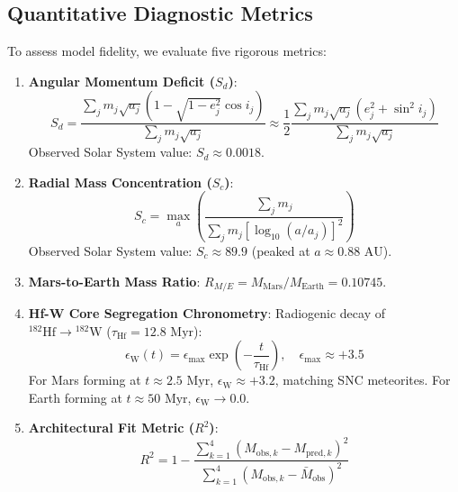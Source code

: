 \documentclass[11pt,a4paper]{article}
\begin{document}
\subsection{Quantitative Diagnostic Metrics}
To assess model fidelity, we evaluate five rigorous metrics:
\begin{enumerate}
    \item \textbf{Angular Momentum Deficit ($S_d$)}:
    \begin{equation}
    S_d = \frac{\sum_j m_j \sqrt{a_j} \left(1 - \sqrt{1 - e_j^2} \cos i_j\right)}{\sum_j m_j \sqrt{a_j}} \approx \frac{1}{2} \frac{\sum_j m_j \sqrt{a_j} (e_j^2 + \sin^2 i_j)}{\sum_j m_j \sqrt{a_j}}
    \end{equation}
    Observed Solar System value: $S_d \approx 0.0018$.
    
    \item \textbf{Radial Mass Concentration ($S_c$)}:
    \begin{equation}
    S_c = \max_a \left( \frac{\sum_j m_j}{\sum_j m_j \left[\log_{10}(a / a_j)\right]^2} \right)
    \end{equation}
    Observed Solar System value: $S_c \approx 89.9$ (peaked at $a \approx 0.88\text{ AU}$).
    
    \item \textbf{Mars-to-Earth Mass Ratio}: $R_{M/E} = M_{\text{Mars}} / M_{\text{Earth}} = 0.10745$.
    
    \item \textbf{Hf-W Core Segregation Chronometry}: Radiogenic decay of $^{182}\text{Hf} \to {}^{182}\text{W}$ ($\tau_{\text{Hf}} = 12.8\text{ Myr}$):
    \begin{equation}
    \epsilon_{\text{W}}(t) = \epsilon_{\text{max}} \exp\left(-\frac{t}{\tau_{\text{Hf}}}\right), \quad \epsilon_{\text{max}} \approx +3.5
    \end{equation}
    For Mars forming at $t \approx 2.5\text{ Myr}$, $\epsilon_{\text{W}} \approx +3.2$, matching SNC meteorites. For Earth forming at $t \approx 50\text{ Myr}$, $\epsilon_{\text{W}} \to 0.0$.
    
    \item \textbf{Architectural Fit Metric ($R^2$)}:
    \begin{equation}
    R^2 = 1 - \frac{\sum_{k=1}^4 (M_{\text{obs}, k} - M_{\text{pred}, k})^2}{\sum_{k=1}^4 (M_{\text{obs}, k} - \bar{M}_{\text{obs}})^2}
    \end{equation}
\end{enumerate}
\end{document}
